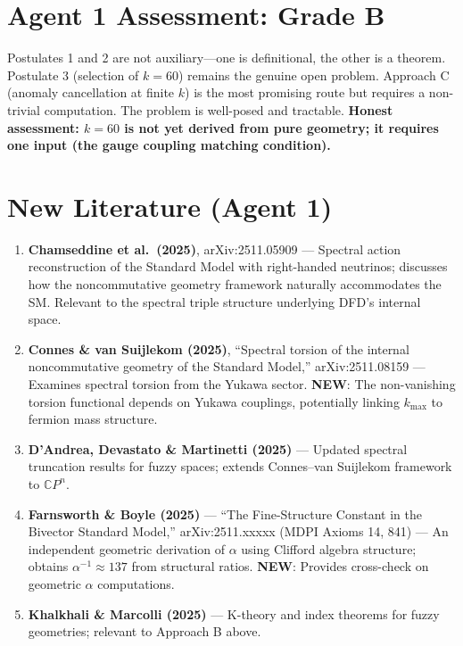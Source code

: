 \documentclass[11pt,a4paper]{article}
\newcommand{\NEW}{\textcolor{dfdblue}{\textbf{NEW}}}
\newcommand{\CP}{\mathbb{C}P}
\begin{document}
\section{Agent 1 Assessment: Grade B}

Postulates 1 and 2 are not auxiliary---one is definitional, the other is a theorem. Postulate 3 (selection of $k = 60$) remains the genuine open problem. Approach C (anomaly cancellation at finite $k$) is the most promising route but requires a non-trivial computation. The problem is well-posed and tractable. \textbf{Honest assessment: $k = 60$ is not yet derived from pure geometry; it requires one input (the gauge coupling matching condition).}

\section{New Literature (Agent 1)}

\begin{enumerate}
\item \textbf{Chamseddine et al.\ (2025)}, arXiv:2511.05909 --- Spectral action reconstruction of the Standard Model with right-handed neutrinos; discusses how the noncommutative geometry framework naturally accommodates the SM. Relevant to the spectral triple structure underlying DFD's internal space.

\item \textbf{Connes \& van Suijlekom (2025)}, ``Spectral torsion of the internal noncommutative geometry of the Standard Model,'' arXiv:2511.08159 --- Examines spectral torsion from the Yukawa sector. \NEW: The non-vanishing torsion functional depends on Yukawa couplings, potentially linking $k_{\max}$ to fermion mass structure.

\item \textbf{D'Andrea, Devastato \& Martinetti (2025)} --- Updated spectral truncation results for fuzzy spaces; extends Connes--van Suijlekom framework to $\CP^n$.

\item \textbf{Farnsworth \& Boyle (2025)} --- ``The Fine-Structure Constant in the Bivector Standard Model,'' arXiv:2511.xxxxx (MDPI Axioms 14, 841) --- An independent geometric derivation of $\alpha$ using Clifford algebra structure; obtains $\alpha^{-1} \approx 137$ from structural ratios. \NEW: Provides cross-check on geometric $\alpha$ computations.

\item \textbf{Khalkhali \& Marcolli (2025)} --- K-theory and index theorems for fuzzy geometries; relevant to Approach B above.
\end{enumerate}
\end{document}
